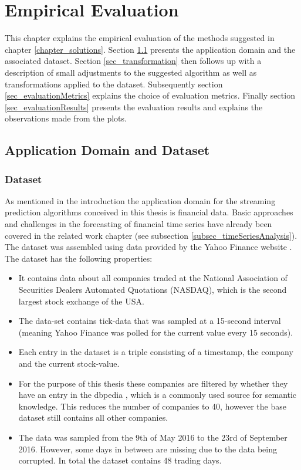 \chapter{Empirical Evaluation}
\label{chapter_evaluation}

\ifpdf
    \graphicspath{{Chapter6/Figs/Raster/}{Chapter6/Figs/PDF/}{Chapter6/Figs/}}
\else
    \graphicspath{{Chapter6/Figs/Vector/}{Chapter6/Figs/}}
\fi

This chapter explains the empirical evaluation of the methods suggested in chapter \ref{chapter_solutions}. Section \ref{sec_applicationDomain} presents the application domain and the associated dataset. Section \ref{sec_transformation} then follows up with a description of small adjustments to the suggested algorithm as well as transformations applied to the dataset. Subsequently section \ref{sec_evaluationMetrics} explains the choice of evaluation metrics. Finally section \ref{sec_evaluationResults} presents the evaluation results and explains the observations made from the plots.

\section{Application Domain and Dataset}
\label{sec_applicationDomain}

\subsection{Dataset}
As mentioned in the introduction the application domain for the streaming prediction algorithms conceived in this thesis is financial data. Basic approaches and challenges in the forecasting of financial time series have already been covered in the related work chapter (see subsection \ref{subsec_timeSeriesAnalysis}). The dataset was assembled using data provided by the Yahoo Finance website \cite{yahooFinance}. The dataset has the following properties:
\begin{itemize}
	\item It contains data about all companies traded at the National Association of Securities Dealers Automated Quotations (NASDAQ), which is the second largest stock exchange of the USA.
	\item The data-set contains tick-data that was sampled at a 15-second interval (meaning Yahoo Finance was polled for the current value every 15 seconds).
	\item Each entry in the dataset is a triple consisting of a timestamp, the company and the current stock-value.
	\item For the purpose of this thesis these companies are filtered by whether they have an entry in the dbpedia \cite{auer2007dbpedia}, which is a commonly used source for semantic knowledge. This reduces the number of companies to 40, however the base dataset still contains all other companies.
	\item The data was sampled from the 9th of May 2016 to the 23rd of September 2016. However, some days in between are missing due to the data being corrupted. In total the dataset contains 48 trading days.
\end{itemize}


